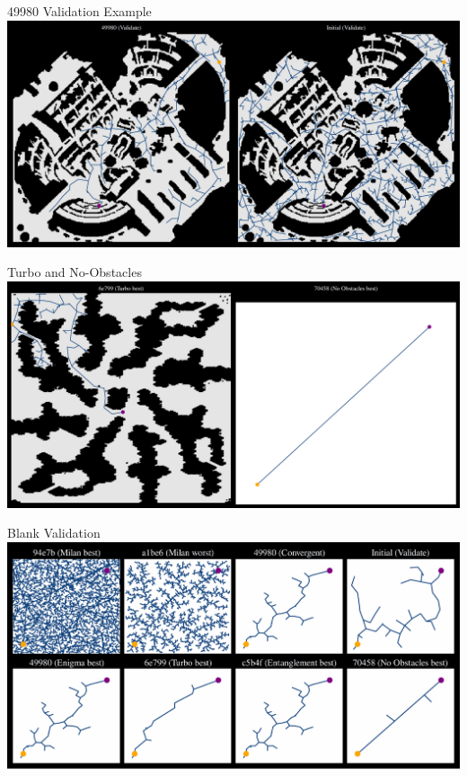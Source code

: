 \documentclass[aspectratio=169]{beamer}
\begin{document}
\begin{frame}{49980 Validation Example}
    \includegraphics[width=1.0\linewidth, keepaspectratio]{figures/learned_split_2.pdf}
\end{frame}

\begin{frame}{Turbo and No-Obstacles}
    \includegraphics[width=1.0\linewidth, keepaspectratio]{figures/learned_split_3.pdf}
\end{frame}


\begin{frame}{Blank Validation}
    \includegraphics[width=1.0\linewidth, keepaspectratio]{figures/blank_val.pdf}
\end{frame}
\end{document}

